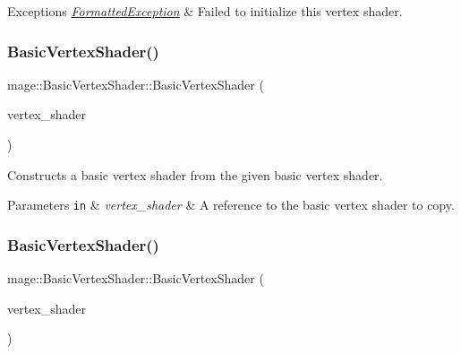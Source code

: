 \begin{DoxyExceptions}{Exceptions}
{\em \hyperlink{structmage_1_1_formatted_exception}{Formatted\+Exception}} & Failed to initialize this vertex shader. \\
\hline
\end{DoxyExceptions}
\hypertarget{classmage_1_1_basic_vertex_shader_ab547bf423545c41882a691ff3ebb32ce}{}\label{classmage_1_1_basic_vertex_shader_ab547bf423545c41882a691ff3ebb32ce} 
\subsubsection{\texorpdfstring{Basic\+Vertex\+Shader()}{BasicVertexShader()}\hspace{0.1cm}{\footnotesize\ttfamily [3/4]}}
{\footnotesize\ttfamily mage\+::\+Basic\+Vertex\+Shader\+::\+Basic\+Vertex\+Shader (\begin{DoxyParamCaption}\item[{const \hyperlink{classmage_1_1_basic_vertex_shader}{Basic\+Vertex\+Shader} \&}]{vertex\+\_\+shader }\end{DoxyParamCaption})\hspace{0.3cm}{\ttfamily [delete]}}

Constructs a basic vertex shader from the given basic vertex shader.


\begin{DoxyParams}[1]{Parameters}
\mbox{\tt in}  & {\em vertex\+\_\+shader} & A reference to the basic vertex shader to copy. \\
\hline
\end{DoxyParams}
\hypertarget{classmage_1_1_basic_vertex_shader_a1c5f899e5dfaf81609e8e8fd73103ab2}{}\label{classmage_1_1_basic_vertex_shader_a1c5f899e5dfaf81609e8e8fd73103ab2} 
\subsubsection{\texorpdfstring{Basic\+Vertex\+Shader()}{BasicVertexShader()}\hspace{0.1cm}{\footnotesize\ttfamily [4/4]}}
{\footnotesize\ttfamily mage\+::\+Basic\+Vertex\+Shader\+::\+Basic\+Vertex\+Shader (\begin{DoxyParamCaption}\item[{\hyperlink{classmage_1_1_basic_vertex_shader}{Basic\+Vertex\+Shader} \&\&}]{vertex\+\_\+shader }\end{DoxyParamCaption})\hspace{0.3cm}{\ttfamily [default]}}

